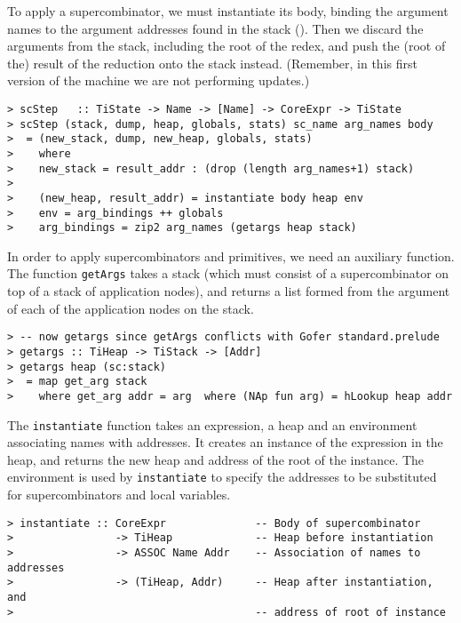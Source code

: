 To apply a supercombinator, we must
instantiate its body,
binding the argument names to the argument addresses found
in the stack ().
Then we discard the arguments from the stack, including
the root of the redex, and push the (root of the) result of the
reduction onto the stack instead.
(Remember, in this first version of the machine we are not performing updates.)
\label{page:sc-step}
\begin{verbatim}
> scStep   :: TiState -> Name -> [Name] -> CoreExpr -> TiState
> scStep (stack, dump, heap, globals, stats) sc_name arg_names body
>  = (new_stack, dump, new_heap, globals, stats)
>    where
>    new_stack = result_addr : (drop (length arg_names+1) stack)
>
>    (new_heap, result_addr) = instantiate body heap env
>    env = arg_bindings ++ globals
>    arg_bindings = zip2 arg_names (getargs heap stack)
\end{verbatim}
%
%
\par
In order to apply supercombinators and primitives, we need an
auxiliary function.
The function \mbox{\tt getArgs} takes a stack (which must consist
of a supercombinator on top of a stack of application nodes),
and returns a list formed from the argument of each of the application nodes
on the stack.
\begin{verbatim}
> -- now getargs since getArgs conflicts with Gofer standard.prelude
> getargs :: TiHeap -> TiStack -> [Addr]
> getargs heap (sc:stack)
>  = map get_arg stack
>    where get_arg addr = arg  where (NAp fun arg) = hLookup heap addr
\end{verbatim}
%
%
\par
The \mbox{\tt instantiate} function takes an expression, a heap and
an environment associating
names with addresses.
It creates an instance of the expression in the heap, and
returns the new heap and address of the root of the instance.
The environment is used by \mbox{\tt instantiate}
to specify the addresses to be substituted for supercombinators and
local variables.
\begin{verbatim}
> instantiate :: CoreExpr              -- Body of supercombinator
>                -> TiHeap             -- Heap before instantiation
>                -> ASSOC Name Addr    -- Association of names to addresses
>                -> (TiHeap, Addr)     -- Heap after instantiation, and
>                                      -- address of root of instance
\end{verbatim}
